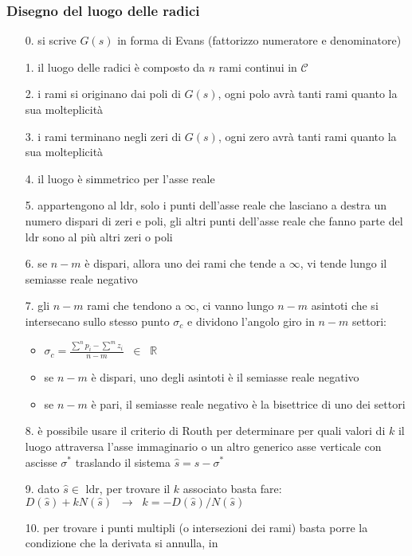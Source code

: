 \subsubsection*{Disegno del luogo delle radici}
\begin{itemize}
	\item[0.] si scrive \(G(s)\) in forma di Evans (fattorizzo numeratore e denominatore)
	\item[1.] il luogo delle radici è composto da \(n\) rami continui in \(\mathcal{C}\)
	\item[2.] i rami si originano dai poli di \(G(s)\), ogni polo avrà tanti rami quanto la sua molteplicità
	\item[3.] i rami terminano negli zeri di \(G(s)\), ogni zero avrà tanti rami quanto la sua molteplicità
	\item[4.] il luogo è simmetrico per l'asse reale
	\item[5.] appartengono al ldr, solo i punti dell'asse reale che lasciano a destra un numero dispari di zeri e poli, gli altri
	punti dell'asse reale che fanno parte del ldr sono al più altri zeri o poli
	\item[6.] se \(n-m\) è dispari, allora uno dei rami che tende a \(\infty\), vi tende lungo il semiasse reale negativo
	\item[7.] gli \(n-m\) rami che tendono a \(\infty\), ci vanno lungo \(n-m\) asintoti che si intersecano sullo stesso punto
	\(\sigma_c\) e dividono l'angolo giro in \(n-m\) settori:
	\begin{itemize}
		\item \(\sigma_c = \frac{\sum^n p_i - \sum^m z_i}{n-m} \;\; \in \;\; \mathbb{R}\)
		\item se \(n-m\) è dispari, uno degli asintoti è il semiasse reale negativo
		\item se \(n-m\) è pari, il semiasse reale negativo è la bisettrice di uno dei settori
	\end{itemize}
	\item[8.] è possibile usare il criterio di Routh per determinare per quali valori di \(k\) il luogo attraversa l'asse immaginario
	o un altro generico asse verticale con ascisse \(\sigma^*\) traslando il sistema \(\hat{s} = s - \sigma^*\)
	\item[9.] dato \(\hat{s} \in\) ldr, per trovare il \(k\) associato basta fare: \(D(\hat{s}) + kN(\hat{s}) \;\;\rightarrow\;\; k = -D(\hat{s})/N(\hat{s})\)
	\item[10.] per trovare i punti multipli (o intersezioni dei rami) basta porre la condizione che la derivata si annulla, in

\end{itemize}
